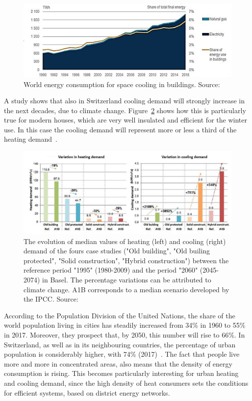 \documentclass{article}
\begin{document}
\begin{figure}[h!]
	\centering
	\includegraphics[width=1\textwidth]{cooling_energy.JPG}
	\caption{World energy consumption for space cooling in buildings. Source:\cite{birolFutureCooling2018}}
	\label{fig:cooling_energy}
\end{figure}

A study shows that also in Switzerland cooling demand will strongly increase in the next decades, due to climate change. Figure~\ref{fig:climat_CH} shows how this is particularly true for modern houses, which are very well insulated and efficient for the winter use. In this case the cooling demand will represent more or less a third of the heating demand~\cite{hsluClimaBauPlanenAngesichts2017}.\\

\begin{figure}[h!]
	\centering
	\includegraphics[width=1\textwidth]{clima_CH.jpg}
	\caption{The evolution of median values of heating (left) and cooling (right) demand of the fours case studies ("Old building", "Old builing protected", "Solid construction", "Hybrid construction") between the reference period "1995" (1980-2009) and the period "2060" (2045-2074) in Basel. The percentage variations can be attributed to climate change. A1B corresponds to a median scenario developed by the IPCC. Source:~\cite{hsluClimaBauPlanenAngesichts2017}}
	\label{fig:climat_CH}
\end{figure}

According to the Population Division of the United Nations, the share of the world population living in cities has steadily increased from 34\% in 1960 to 55\% in 2017. Moreover, they prospect that, by 2050, this number will rise to 66\%. In Switzerland, as well as in its neighbouring countries, the percentage of urban population is considerably higher, with 74\% (2017)~\cite{unitednationspopulationdivisionWorldUrbanizationProspects}.
The fact that people live more and more in concentrated areas, also means that the density of energy consumption is rising. This becomes particularly interesting for urban heating and cooling demand, since the high density of heat consumers sets the conditions for efficient  systems, based on district energy networks. 
\end{document}
